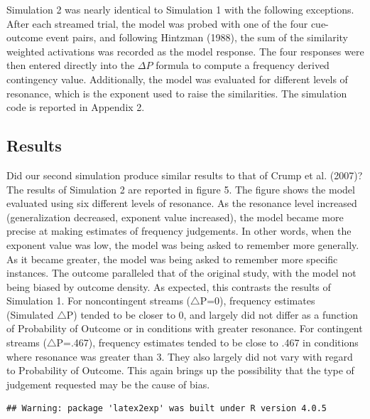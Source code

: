 \documentclass[
  english,
  man,floatsintext]{apa6}
\begin{document}
Simulation 2 was nearly identical to Simulation 1 with the following exceptions. After each streamed trial, the model was probed with one of the four cue-outcome event pairs, and following Hintzman (1988), the sum of the similarity weighted activations was recorded as the model response. The four responses were then entered directly into the \(\Delta P\) formula to compute a frequency derived contingency value. Additionally, the model was evaluated for different levels of resonance, which is the exponent used to raise the similarities. The simulation code is reported in Appendix 2.

\hypertarget{results-1}{%
\subsection{Results}\label{results-1}}

Did our second simulation produce similar results to that of Crump et al. (2007)? The results of Simulation 2 are reported in figure 5. The figure shows the model evaluated using six different levels of resonance. As the resonance level increased (generalization decreased, exponent value increased), the model became more precise at making estimates of frequency judgements. In other words, when the exponent value was low, the model was being asked to remember more generally. As it became greater, the model was being asked to remember more specific instances. The outcome paralleled that of the original study, with the model not being biased by outcome density. As expected, this contrasts the results of Simulation 1. For noncontingent streams (\(\triangle\)P=0), frequency estimates (Simulated \(\triangle\)P) tended to be closer to 0, and largely did not differ as a function of Probability of Outcome or in conditions with greater resonance. For contingent streams (\(\triangle\)P=.467), frequency estimates tended to be close to .467 in conditions where resonance was greater than 3. They also largely did not vary with regard to Probability of Outcome. This again brings up the possibility that the type of judgement requested may be the cause of bias.

\begin{verbatim}
## Warning: package 'latex2exp' was built under R version 4.0.5
\end{verbatim}
\end{document}
